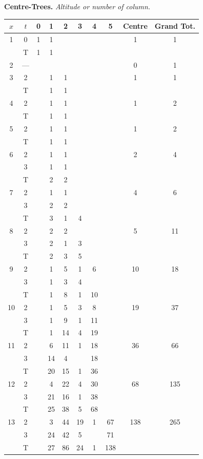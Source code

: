\documentclass[11pt,a4paper]{article}
\begin{document}
\begin{small}
\noindent\textbf{Centre-Trees.} \textit{Altitude or number of column.}
\begin{center}
\begin{tabular}{|c|c|cccccc|c|c|}
\hline
$x$ & $t$ & 0 & 1 & 2 & 3 & 4 & 5 & Centre & Grand Tot. \\
\hline
1 & 0 & 1 & 1 & & & & & 1 & 1 \\
  & T & 1 & 1 & & & & & & \\
\hline
2 & --- & & & & & & & 0 & 1 \\
\hline
3 & 2 & & 1 & 1 & & & & 1 & 1 \\
  & T & & 1 & 1 & & & & & \\
\hline
4 & 2 & & 1 & 1 & & & & 1 & 2 \\
  & T & & 1 & 1 & & & & & \\
\hline
5 & 2 & & 1 & 1 & & & & 1 & 2 \\
  & T & & 1 & 1 & & & & & \\
\hline
6 & 2 & & 1 & 1 & & & & 2 & 4 \\
  & 3 & & 1 & 1 & & & & & \\
  & T & & 2 & 2 & & & & & \\
\hline
7 & 2 & & 1 & 1 & & & & 4 & 6 \\
  & 3 & & 2 & 2 & & & & & \\
  & T & & 3 & 1 & 4 & & & & \\
\hline
8 & 2 & & 2 & 2 & & & & 5 & 11 \\
  & 3 & & 2 & 1 & 3 & & & & \\
  & T & & 2 & 3 & 5 & & & & \\
\hline
9 & 2 & & 1 & 5 & 1 & 6 & & 10 & 18 \\
  & 3 & & 1 & 3 & 4 & & & & \\
  & T & & 1 & 8 & 1 & 10 & & & \\
\hline
10 & 2 & & 1 & 5 & 3 & 8 & & 19 & 37 \\
   & 3 & & 1 & 9 & 1 & 11 & & & \\
   & T & & 1 & 14 & 4 & 19 & & & \\
\hline
11 & 2 & & 6 & 11 & 1 & 18 & & 36 & 66 \\
   & 3 & & 14 & 4 & & 18 & & & \\
   & T & & 20 & 15 & 1 & 36 & & & \\
\hline
12 & 2 & & 4 & 22 & 4 & 30 & & 68 & 135 \\
   & 3 & & 21 & 16 & 1 & 38 & & & \\
   & T & & 25 & 38 & 5 & 68 & & & \\
\hline
13 & 2 & & 3 & 44 & 19 & 1 & 67 & 138 & 265 \\
   & 3 & & 24 & 42 & 5 & & 71 & & \\
   & T & & 27 & 86 & 24 & 1 & 138 & & \\
\hline
\end{tabular}
\end{center}


\end{small}
\end{document}

